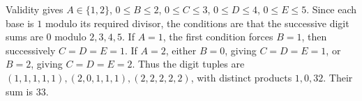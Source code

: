 Validity gives $A\in\{1,2\}$, $0\le B\le2$, $0\le C\le3$, $0\le D\le4$, $0\le E\le5$. Since each base is $1$ modulo its required divisor, the conditions are that the successive digit sums are $0$ modulo $2,3,4,5$. If $A=1$, the first condition forces $B=1$, then successively $C=D=E=1$. If $A=2$, either $B=0$, giving $C=D=E=1$, or $B=2$, giving $C=D=E=2$. Thus the digit tuples are $(1,1,1,1,1),(2,0,1,1,1),(2,2,2,2,2)$, with distinct products $1,0,32$. Their sum is $\boxed{33}$.
